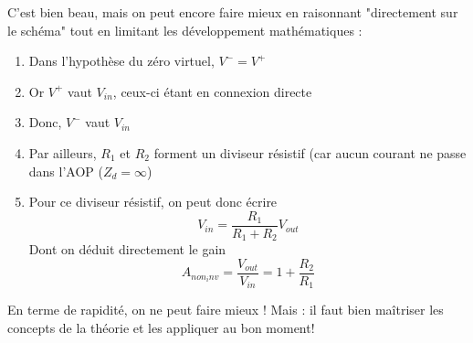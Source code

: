 \documentclass	[11pt, a4paper, openany]{book}
\begin{document}
C'est bien beau, mais on peut encore faire mieux en raisonnant "directement sur le schéma" tout en limitant les développement mathématiques :
\begin{enumerate}
\item Dans l'hypothèse du zéro virtuel, $V^- = V^+$
\item Or $V^+$ vaut $V_{in}$, ceux-ci étant en connexion directe
\item Donc, $V^-$ vaut $V_{in}$
\item Par ailleurs, $R_1$ et $R_2$ forment un diviseur résistif (car aucun courant ne passe dans l'AOP ($Z_d = \infty$)
\item Pour ce diviseur résistif, on peut donc écrire
\begin{equation}
V_{in} = \frac{R_1}{R_1+R_2}V_{out}
\end{equation}
Dont on déduit directement le gain
\begin{equation}
A_{non_inv} = \frac{V_{out}}{V_{in}} = 1+\frac{R_2}{R_1}
\end{equation}
\end{enumerate}

En terme de rapidité, on ne peut faire mieux ! Mais : il faut bien maîtriser les concepts de la théorie et les appliquer au bon moment! 
\end{document}
